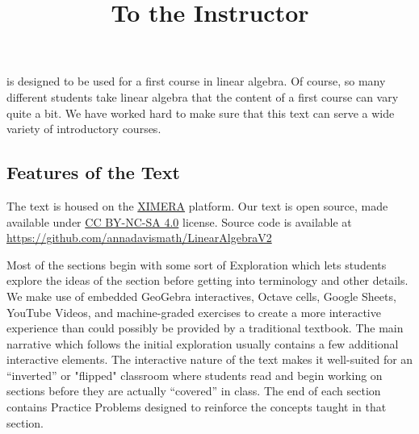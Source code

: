 \documentclass{ximera}
\title{To the Instructor} \license{CC BY-NC-SA 4.0}
\begin{document}
\begin{abstract}
\end{abstract}
\maketitle

 is designed to be used for a first course in linear algebra.  Of course, so many different students take linear algebra that the content of a first course can vary quite a bit.  We have worked hard to make sure that this text can serve a wide variety of introductory courses. 

\subsection{Features of the Text}

The text is housed on the \href{https://ximera.osu.edu/}{XIMERA} platform. %
Our text is open source, made available under \href{https://creativecommons.org/licenses/by-sa/4.0/deed.en}{CC BY-NC-SA 4.0} license.  Source code is available at \href{https://github.com/annadavismath/LinearAlgebraV2}{https://github.com/annadavismath/LinearAlgebraV2}

Most of the sections begin with some sort of Exploration which lets students explore the ideas of the section before getting into terminology and other details.  We make use of embedded GeoGebra interactives, Octave cells, Google Sheets, YouTube Videos, and machine-graded exercises to create a more interactive experience than could possibly be provided by a traditional textbook.  The main narrative which follows the initial exploration usually contains a few additional interactive elements.  The interactive nature of the text %
makes it well-suited for an ``inverted'' or "flipped" classroom where students read and begin working on sections before they are actually ``covered'' in class.  The end of each section contains Practice Problems designed to reinforce the concepts taught in that section.
\end{document}
